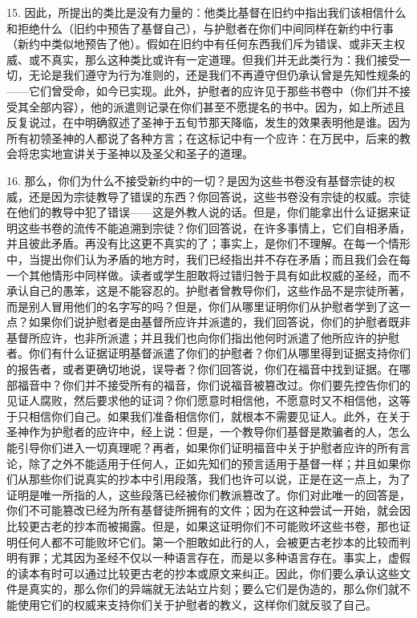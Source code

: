 15. 因此，所提出的类比是没有力量的：他类比基督在旧约中指出我们该相信什么和拒绝什么（旧约中预告了基督自己），与护慰者在你们中间同样在新约中行事（新约中类似地预告了他）。假如在旧约中有任何东西我们斥为错误、或非天主权威、或不真实，那么这种类比或许有一定道理。但我们并无此类行为：我们接受一切，无论是我们遵守为行为准则的，还是我们不再遵守但仍承认曾是先知性规条的——它们曾受命，如今已实现。此外，护慰者的应许见于那些书卷中（你们并不接受其全部内容），他的派遣则记录在你们甚至不愿提名的书中。因为，如上所述且反复说过，在中明确叙述了圣神于五旬节那天降临，发生的效果表明他是谁。因为所有初领圣神的人都说了各种方言；在这标记中有一个应许：在万民中，后来的教会将忠实地宣讲关于圣神以及圣父和圣子的道理。\par

16. 那么，你们为什么不接受新约中的一切？是因为这些书卷没有基督宗徒的权威，还是因为宗徒教导了错误的东西？你回答说，这些书卷没有宗徒的权威。宗徒在他们的教导中犯了错误——这是外教人说的话。但是，你们能拿出什么证据来证明这些书卷的流传不能追溯到宗徒？你们回答说，在许多事情上，它们自相矛盾，并且彼此矛盾。再没有比这更不真实的了；事实上，是你们不理解。在每一个情形中，当提出你们认为矛盾的地方时，我们已经指出并不存在矛盾；而且我们会在每一个其他情形中同样做。读者或学生胆敢将过错归咎于具有如此权威的圣经，而不承认自己的愚笨，这是不能容忍的。护慰者曾教导你们，这些作品不是宗徒所著，而是别人冒用他们的名字写的吗？但是，你们从哪里证明你们从护慰者学到了这一点？如果你们说护慰者是由基督所应许并派遣的，我们回答说，你们的护慰者既非基督所应许，也非所派遣；并且我们也向你们指出他何时派遣了他所应许的护慰者。你们有什么证据证明基督派遣了你们的护慰者？你们从哪里得到证据支持你们的报告者，或者更确切地说，误导者？你们回答说，你们在福音中找到证据。在哪部福音中？你们并不接受所有的福音，你们说福音被篡改过。你们要先控告你们的见证人腐败，然后要求他的证词？你们愿意时相信他，不愿意时又不相信他，这等于只相信你们自己。如果我们准备相信你们，就根本不需要见证人。此外，在关于圣神作为护慰者的应许中，经上说：但是，一个教导你们基督是欺骗者的人，怎么能引导你们进入一切真理呢？再者，如果你们证明福音中关于护慰者应许的所有言论，除了之外不能适用于任何人，正如先知们的预言适用于基督一样；并且如果你们从那些你们说真实的抄本中引用段落，我们也许可以说，正是在这一点上，为了证明是唯一所指的人，这些段落已经被你们教派篡改了。你们对此唯一的回答是，你们不可能篡改已经为所有基督徒所拥有的文件；因为在这种尝试一开始，就会因比较更古老的抄本而被揭露。但是，如果这证明你们不可能败坏这些书卷，那也证明任何人都不可能败坏它们。第一个胆敢如此行的人，会被更古老抄本的比较而判明有罪；尤其因为圣经不仅以一种语言存在，而是以多种语言存在。事实上，虚假的读本有时可以通过比较更古老的抄本或原文来纠正。因此，你们要么承认这些文件是真实的，那么你们的异端就无法站立片刻；要么它们是伪造的，那么你们就不能使用它们的权威来支持你们关于护慰者的教义，这样你们就反驳了自己。\par

